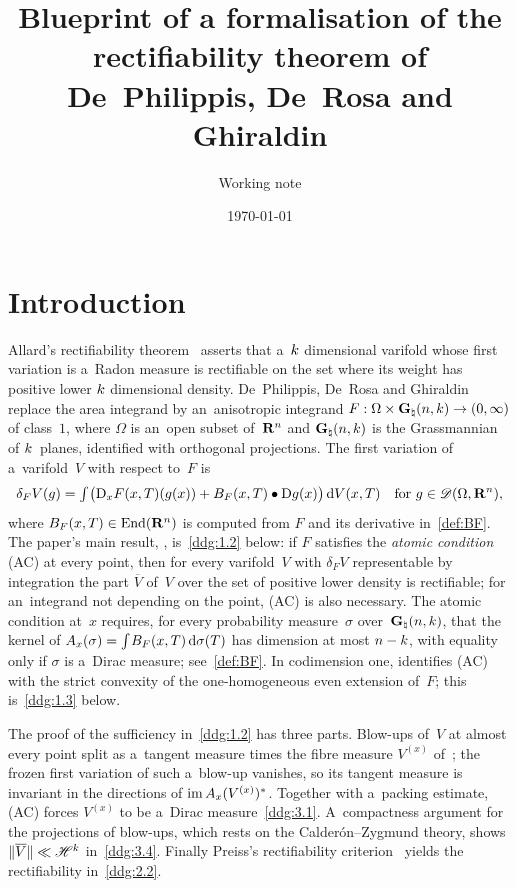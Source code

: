 \documentclass[a4paper,twoside,leqno]{article}
\date{\today}
\title{Blueprint of a formalisation of the rectifiability theorem of De~Philippis, De~Rosa and
    Ghiraldin}
\author{Working note}
\newcommand{\Gk}{\pgrass{\adim}{\vdim}}        %
\begin{document}
\maketitle

\tableofcontents

\section{Introduction}
\label{sec:intro}

Allard's rectifiability theorem~\cite[5.5(1)]{Allard1972} asserts that a~$k$ dimensional
varifold whose first variation is a~Radon measure is rectifiable on the set where its weight has
positive lower $k$ dimensional density. De~Philippis, De~Rosa and Ghiraldin~\cite{DePhilippis2018}
replace the area integrand by an~anisotropic integrand $F : \Omega \times \Gk \to (0,\infty)$ of
class~$1$, where $\Omega$ is an~open subset of~$\mathbf{R}^{n}$ and $\Gk$ is the Grassmannian of
$k$~planes, identified with orthogonal projections. The first variation of a~varifold~$V$ with
respect to~$F$ is
\begin{displaymath}
    \delta_F V(g) = {\textstyle\int_{}^{}} \bigl( \mathrm{D}_x F(x,T)(g(x)) + B_F(x,T) \bullet \mathrm{D} g(x) \bigr) \,\mathrm{d}
    V(x,T) \quad \text{for $g \in \mathscr{D}(\Omega,\mathbf{R}^{n})$},
\end{displaymath}
where $B_F(x,T) \in \mathrm{End}({\mathbf{R}^{n}})$ is computed from $F$ and its derivative in~\ref{def:BF}. The
paper's main result, \cite[Theorem~1.2]{DePhilippis2018}, is~\ref{ddg:1.2} below: if $F$
satisfies the \emph{atomic condition} (AC) at every point, then for every varifold~$V$ with
$\delta_F V$ representable by integration the part $\overline V$ of~$V$ over the set of positive
lower density is rectifiable; for an~integrand not depending on the point, (AC) is also necessary.
The atomic condition at~$x$ requires, for every probability measure~$\sigma$ over~$\Gk$, that the
kernel of $A_x(\sigma) = {\textstyle\int_{}^{}} B_F(x,T) \,\mathrm{d} \sigma(T)$ has dimension at most $n -
k$, with equality only if $\sigma$ is a~Dirac measure; see~\ref{def:BF}.
In codimension one, \cite[Theorem~1.3]{DePhilippis2018} identifies (AC) with the strict
convexity of the one-homogeneous even extension of~$F$; this is~\ref{ddg:1.3} below.

The proof of the sufficiency in~\ref{ddg:1.2} has three parts. Blow-ups of~$V$ at almost every
point split as a~tangent measure times the fibre measure $V^{(x)}$ of~\cite[3.3]{Allard1972};
the frozen first variation of such a~blow-up vanishes, so its tangent measure is invariant in
the directions of $\operatorname{im} A_x(V^{(x)})^*$. Together with a~packing estimate, (AC) forces $V^{(x)}$ to
be a~Dirac measure~\ref{ddg:3.1}. A~compactness argument for the projections of blow-ups, which
rests on the Calder\'on--Zygmund theory, shows $\|\overline V\| \ll \mathscr{H}^{k}$
in~\ref{ddg:3.4}. Finally Preiss's rectifiability criterion~\cite[5.3]{Preiss1987} yields the
rectifiability in~\ref{ddg:2.2}.
\end{document}
